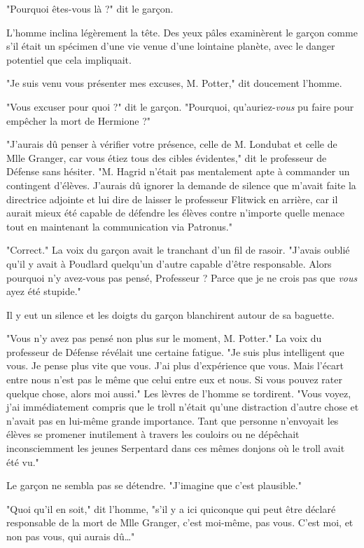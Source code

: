 "Pourquoi êtes-vous là ?" dit le garçon.

L'homme inclina légèrement la tête. Des yeux pâles examinèrent le garçon comme s'il était un spécimen d'une vie venue d'une lointaine planète, avec le danger potentiel que cela impliquait.

"Je suis venu vous présenter mes excuses, M. Potter," dit doucement l'homme.

"Vous excuser pour quoi ?" dit le garçon. "Pourquoi, qu'auriez-\emph{vous}  pu faire pour empêcher la mort de Hermione ?"

"J'aurais dû penser à vérifier votre présence, celle de M. Londubat et celle de Mlle Granger, car vous étiez tous des cibles évidentes," dit le professeur de Défense sans hésiter. "M. Hagrid n'était pas mentalement apte à commander un contingent d'élèves. J'aurais dû ignorer la demande de silence que m'avait faite la directrice adjointe et lui dire de laisser le professeur Flitwick en arrière, car il aurait mieux été capable de défendre les élèves contre n'importe quelle menace tout en maintenant la communication via Patronus."

"Correct." La voix du garçon avait le tranchant d'un fil de rasoir. "J'avais oublié qu'il y avait à Poudlard quelqu'un d'autre capable d'être responsable. Alors pourquoi n'y avez-vous pas pensé, Professeur ? Parce que je ne crois pas que \emph{vous}  ayez été stupide."

Il y eut un silence et les doigts du garçon blanchirent autour de sa baguette.

"Vous n'y avez pas pensé non plus sur le moment, M. Potter." La voix du professeur de Défense révélait une certaine fatigue. "Je suis plus intelligent que vous. Je pense plus vite que vous. J'ai plus d'expérience que vous. Mais l'écart entre nous n'est pas le même que celui entre eux et nous. Si vous pouvez rater quelque chose, alors moi aussi." Les lèvres de l'homme se tordirent. "Vous voyez, j'ai immédiatement compris que le troll n'était qu'une distraction d'autre chose et n'avait pas en lui-même grande importance. Tant que personne n'envoyait les élèves se promener inutilement à travers les couloirs ou ne dépêchait inconsciemment les jeunes Serpentard dans ces mêmes donjons où le troll avait été vu."

Le garçon ne sembla pas se détendre. "J'imagine que c'est plausible."

"Quoi qu'il en soit," dit l'homme, "s'il y a ici quiconque qui peut être déclaré responsable de la mort de Mlle Granger, c'est moi-même, pas vous. C'est moi, et non pas vous, qui aurais dû…"

